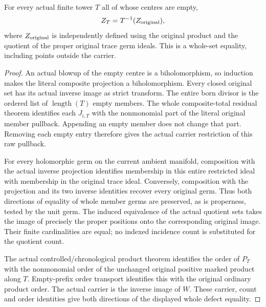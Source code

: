 \begin{theorem}
\label{hir:sharp-actual-empty-history-first-defect}
\leanok
For every actual finite tower $T$ all of whose centres are empty,
\[
 Z_T=T^{-1}(Z_{\rm original}),
\]
where $Z_{\rm original}$ is independently defined using the original product
and the quotient of the proper original trace germ ideals. This is a whole-set
equality, including points outside the carrier.
\end{theorem}
\begin{proof}
An actual blowup of the empty centre is a biholomorphism, so induction makes
the literal composite projection a biholomorphism. Every closed original set
has its actual inverse image as strict transform. The entire born divisor is
the ordered list of $\operatorname{length}(T)$ empty members. The whole
composite-total residual theorem identifies each $J_{i,T}$ with the
nonmonomial part of the literal original member pullback. Appending an empty
member does not change that part. Removing each empty entry therefore gives
the actual carrier restriction of this raw pullback.

For every holomorphic germ on the current ambient manifold, composition with
the actual inverse projection identifies membership in this entire restricted
ideal with membership in the original trace ideal. Conversely, composition
with the projection and its two inverse identities recover every original
germ. Thus both directions of equality of whole member germs are preserved,
as is properness, tested by the unit germ. The induced equivalence of the
actual quotient sets takes the image of precisely the proper positions onto
the corresponding original image. Their finite cardinalities are equal;
no indexed incidence count is substituted for the quotient count.

The actual controlled/chronological product theorem identifies the order of
$P_T$ with the nonmonomial order of the unchanged original positive marked
product along $T$. Empty-prefix order transport identifies this with the
original ordinary product order. The actual carrier is the inverse image of
$W$. These carrier, count and order identities give both directions of the
displayed whole defect equality.
\end{proof}

